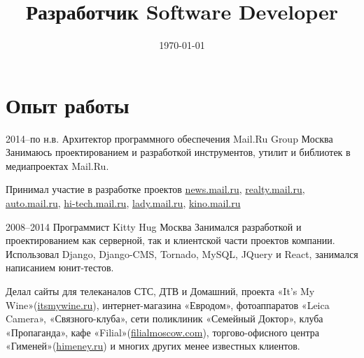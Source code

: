 \documentclass[11pt,a4paper,sans]{moderncv}
\title
    {\lang
        {Разработчик}
        {Software Developer}}
\date{\today}
\newcommand{\lang}[2]{#1}
\begin{document}
\makecvtitle


\section
    {\lang
        {Опыт работы}
        {Work Experience}}


\cventry
    {2014--\lang
        {по н.в.}
        {Present}}
    {\lang
        {Архитектор программного обеспечения}
        {Software Architect}}
    {Mail.Ru Group}
    {\lang
        {Москва}
        {Moscow}}
    {}
    {\lang
        {Занимаюсь проектированием и разработкой инструментов, утилит и библиотек в медиапроектах Mail.Ru.}
        {Design and develop tools, utilities and libraries for Media Projects Mail.Ru}}

\cvlistitem
    {\lang 
        {Принимал участие в разработке проектов \href{https://news.mail.ru}{news.mail.ru}, \href{https://realty.mail.ru}{realty.mail.ru}, \href{https://auto.mail.ru}{auto.mail.ru}, \href{https://hi-tech.mail.ru}{hi-tech.mail.ru}, \href{https://lady.mail.ru}{lady.mail.ru}, \href{https://kino.mail.ru}{kino.mail.ru}}
        {Actively participated in development of such projects as \href{https://news.mail.ru}{news.mail.ru}, \href{https://realty.mail.ru}{realty.mail.ru}, \href{https://auto.mail.ru}{auto.mail.ru}, \href{https://hi-tech.mail.ru}{hi-tech.mail.ru}, \href{https://lady.mail.ru}{lady.mail.ru}, \href{https://kino.mail.ru}{kino.mail.ru}}\newline}


\cventry
    {2008--2014}
    {\lang
        {Программист}
        {Software Developer}}
    {Kitty Hug}
    {\lang
        {Москва}
        {Moscow}}
    {}
    {\lang
        {Занимался разработкой и проектированием как серверной, так и клиентской части проектов компании. Использовал Django, Django-CMS, Tornado, MySQL, JQuery и React, занимался написанием юнит-тестов.}
        {Designed and developed both server and client side of company projects. Used such tools as Django web framework, Django-CMS, Tornado, MySQL, JQuery and React}}

\cvlistitem
    {\lang
        {Делал сайты для телеканалов СТС, ДТВ и Домашний, проекта «It's My Wine»(\href{http://itsmywine.ru}{itsmywine.ru}), интернет-магазина «Евродом», фотоаппаратов «Leica Camera», «Связного-клуба», сети поликлиник «Семейный Доктор», клуба «Пропаганда», кафе «Filial»(\href{http://filialmoscow.com/ru/}{filialmoscow.com}), торгово-офисного центра «Гименей»(\href{http://himeney.ru}{himeney.ru}) и многих других менее известных клиентов.}
        {Made websites}}
\end{document}
